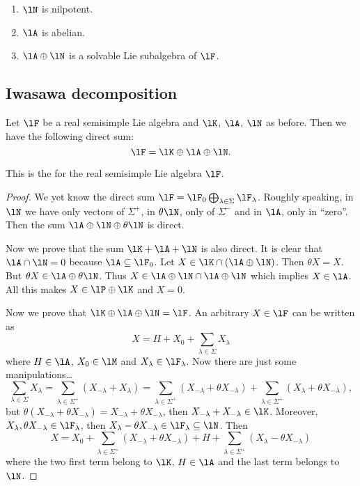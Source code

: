 \begin{enumerate}
\item $\lN$ is nilpotent.
\item $\lA$ is abelian.
\item $\lA\oplus\lN$ is a solvable Lie subalgebra of $\lF$.
\end{enumerate}

\subsection{Iwasawa decomposition}

\begin{theorem}
Let $\lF$ be a real semisimple Lie algebra and $\lK$, $\lA$, $\lN$ as before. Then we have the following direct sum:
\begin{equation}
   \lF=\lK\oplus\lA\oplus\lN.
\end{equation}
\end{theorem}

This is the  for the real semisimple Lie algebra $\lF$.

\begin{proof}
We yet know the direct sum $\lF=\lF_0\bigoplus_{\lambda\in\Sigma}\lF_{\lambda}$. Roughly speaking, in $\lN$ we have only vectors of $\Sigma^+$, in $\theta\lN$, only of $\Sigma^-$ and in $\lA$, only in ``zero''. Then the sum $\lA\oplus\lN\oplus\theta\lN$ is direct.

Now we prove that the sum $\lK+\lA+\lN$ is also direct. It is clear that $\lA\cap\lN=0$ because $\lA\subseteq\lF_0$. Let $X\in\lK\cap(\lA\oplus\lN)$. Then $\theta X=X$. But $\theta X\in\lA\oplus\theta\lN$. Thus $X\in\lA\oplus\lN\cap\lA\oplus\lN$ which implies $X\in\lA$. All this makes $X\in\lP\oplus\lK$ and $X=0$.

Now we prove that $\lK\oplus\lA\oplus\lN=\lF$. An arbitrary $X\in\lF$ can be written as
\[
   X=H+X_0+\sum_{\lambda\in\Sigma}X_{\lambda}
\]
where $H\in\lA$, $X_0\in\lM$ and $X_{\lambda}\in\lF_{\lambda}$. Now there are just some manipulations\ldots
\begin{equation}
  \sum_{\lambda\in\Sigma}X_{\lambda}=\sum_{\lambda\in\Sigma^+}(X_{-\lambda}+X_{\lambda})
                                  =\sum_{\lambda\in\Sigma^+}(X_{-\lambda}+\theta X_{-\lambda})
                  +\sum_{\lambda\in\Sigma^+}(X_{\lambda}+\theta X_{-\lambda}),
\end{equation}
but $\theta(X_{-\lambda}+\theta X_{-\lambda})=X_{-\lambda}+\theta X_{-\lambda}$, then $X_{-\lambda}+X_{-\lambda}\in\lK$. Moreover, $X_{\lambda}, \theta X_{-\lambda}\in\lF_{\lambda}$, then $X_{\lambda}-\theta X_{-\lambda}\in\lF_{\lambda}\subseteq\lN$. Then
\begin{equation}
  X=X_0+\sum_{\lambda\in\Sigma^+}(X_{-\lambda}+\theta X_{-\lambda})+H+\sum_{\lambda\in\Sigma^+}(X_{\lambda}-\theta X_{-\lambda})
\end{equation}
where the two first term belong to $\lK$, $H\in\lA$ and the last term belongs to $\lN$.
\end{proof}

